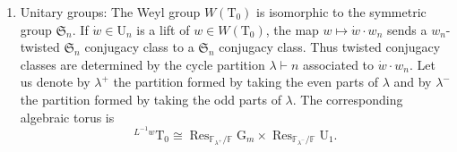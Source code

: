 \documentclass[12pt, reqno]{amsart}
\theoremstyle{definition}
\theoremstyle{definition}
\theoremstyle{definition}
\newcommand{\diag}{\mathrm{diag}}
\newcommand{\UnitaryGroup}{\mathrm{U}}
\newcommand{\finiteField}{\mathbb{F}}
\newcommand{\finiteFieldExtension}[1]{\finiteField_{#1}}
\newcommand{\restrictionOfScalars}[3]{\operatorname{Res}_{#1 \slash #2}{#3}}
\newcommand{\multiplcativeScheme}{\algebraicGroup{G}_m}
\newcommand{\algebraicGroup}[1]{\boldsymbol{\mathrm{#1}}}
\newcommand{\SymmetricGroup}{\mathfrak{S}}
\begin{document}
\begin{enumerate}
    \item Unitary groups: The Weyl group $W\left(\algebraicGroup{T}_{0}\right)$ is isomorphic to the symmetric group $\SymmetricGroup_n$. If $\dot{w} \in \algebraicGroup{\UnitaryGroup}_n$ is a lift of $w \in W\left(\algebraicGroup{T}_{0}\right)$, the map $w \mapsto \dot{w} \cdot w_n$ sends a $w_n$-twisted $\SymmetricGroup_n$ conjugacy class to a $\SymmetricGroup_n$ conjugacy class. Thus twisted conjugacy classes are determined by the cycle partition $\lambda \vdash n$ associated to $\dot{w} \cdot w_n$. Let us denote by $\lambda^+$ the partition formed by taking the even parts of $\lambda$ and by $\lambda^{-}$ the partition formed by taking the odd parts of $\lambda$. The corresponding algebraic torus is
	$$^{L^{-1}w}\algebraicGroup{T}_0 \cong \restrictionOfScalars{\finiteFieldExtension{\lambda^{+}}}{\finiteField}{\multiplcativeScheme} \times \restrictionOfScalars{\finiteFieldExtension{\lambda^{-}}}{\finiteField}{\algebraicGroup{\UnitaryGroup}_1}.$$
	

\end{enumerate}
\end{document}
